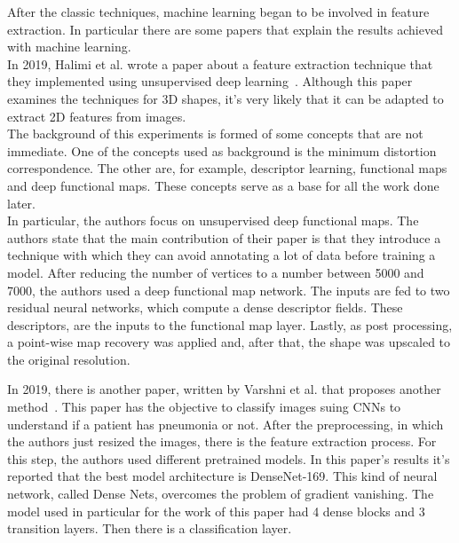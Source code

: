\documentclass[conference]{IEEEtran}
\begin{document}
					After the classic techniques, machine learning began to be involved in feature extraction. In particular there are some papers that explain the results achieved with machine learning.\\
					In 2019, Halimi et al. wrote a paper about a feature extraction technique that they implemented using unsupervised deep learning~\cite{halimi2019unsupervised}. Although this paper examines the techniques for 
					3D shapes, it's very likely that it can be adapted to extract 2D features from images.\\
					The background of this experiments is formed of some concepts that are not immediate. One of the concepts used as background is the minimum distortion correspondence. The other are, for example, 
					descriptor learning, functional maps and deep functional maps. These concepts serve as a base for all the work done later. \\
					In particular, the authors focus on unsupervised deep functional maps. The authors state that the main contribution of their paper is that they introduce a technique with which they can 
					avoid annotating a lot of data before training a model. After reducing the number of vertices to a number between 5000 and 7000, the authors used a deep functional map network. The inputs are 
					fed to two residual neural networks, which compute a dense descriptor fields. These descriptors, are the inputs to the functional map layer. Lastly, as post processing, a point-wise map recovery was 
					applied and, after that, the shape was upscaled to the original resolution. 
					
					\noindent In 2019, there is another paper, written by Varshni et al. that proposes another method~\cite{varshni2019pneumonia}. This paper has the objective to classify images suing CNNs to understand if a patient 
					has pneumonia or not. After the preprocessing, in which the authors just resized the images, there is the feature extraction process. For this step, the authors used different pretrained models.
					In this paper's results it's reported that the best model architecture is DenseNet-169. This kind of neural network, called Dense Nets, overcomes the problem of gradient vanishing. The model used in 
					particular for the work of this paper had 4 dense blocks and 3 transition layers. Then there is a classification layer. 
					
\end{document}
